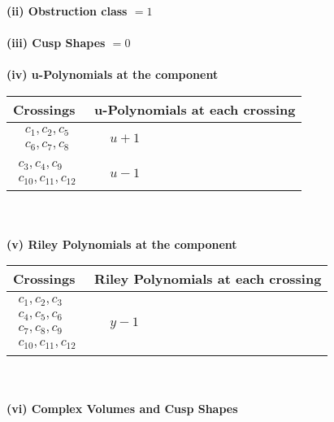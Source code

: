 \documentclass[1p]{elsarticle_modified}
\theoremstyle{definition}
\begin{document}
\flushleft \textbf{(ii) Obstruction class $= 1$}\\~\\
\flushleft \textbf{(iii) Cusp Shapes $= 0$}\\~\\
\newpage\renewcommand{\arraystretch}{1}
\flushleft \textbf{(iv) u-Polynomials at the component}\newline \\
\begin{tabular}{m{50pt}|m{274pt}}
Crossings & \hspace{64pt}u-Polynomials at each crossing \\
\hline $$\begin{aligned}c_{1},c_{2},c_{5}\\c_{6},c_{7},c_{8}\end{aligned}$$&$\begin{aligned}
&u+1
\end{aligned}$\\
\hline $$\begin{aligned}c_{3},c_{4},c_{9}\\c_{10},c_{11},c_{12}\end{aligned}$$&$\begin{aligned}
&u-1
\end{aligned}$\\
\hline
\end{tabular}\\~\\
\newpage\renewcommand{\arraystretch}{1}
\flushleft \textbf{(v) Riley Polynomials at the component}\newline \\
\begin{tabular}{m{50pt}|m{274pt}}
Crossings & \hspace{64pt}Riley Polynomials at each crossing \\
\hline $$\begin{aligned}c_{1},c_{2},c_{3}\\c_{4},c_{5},c_{6}\\c_{7},c_{8},c_{9}\\c_{10},c_{11},c_{12}\end{aligned}$$&$\begin{aligned}
&y-1
\end{aligned}$\\
\hline
\end{tabular}\\~\\
\newpage\flushleft \textbf{(vi) Complex Volumes and Cusp Shapes}
\end{document}
